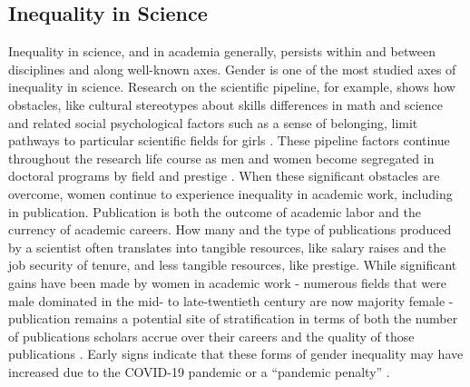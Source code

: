 \documentclass[
  10pt,
  letterpaper,
]{article}
\begin{document}
\subsection{Inequality in Science}\label{inequality-in-science}

Inequality in science, and in academia generally, persists within and
between disciplines and along well-known axes. Gender is one of the most
studied axes of inequality in science. Research on the scientific
pipeline, for example, shows how obstacles, like cultural stereotypes
about skills differences in math and science and related social
psychological factors such as a sense of belonging, limit pathways to
particular scientific fields for girls
\citep{cech_professional_2011, ma_math_2021, penner_men_2019}. These
pipeline factors continue throughout the research life course as men and
women become segregated in doctoral programs by field and prestige
\citep{weeden_degrees_2017a}. When these significant obstacles are
overcome, women continue to experience inequality in academic work,
including in publication. Publication is both the outcome of academic
labor and the currency of academic careers. How many and the type of
publications produced by a scientist often translates into tangible
resources, like salary raises and the job security of tenure, and less
tangible resources, like prestige. While significant gains have been
made by women in academic work - numerous fields that were male
dominated in the mid- to late-twentieth century are now majority female
- publication remains a potential site of stratification in terms of
both the number of publications scholars accrue over their careers and
the quality of those publications
\citep{xie_sex_1998, light_gender_2009}. Early signs indicate that these
forms of gender inequality may have increased due to the COVID-19
pandemic or a ``pandemic penalty'' \citep{king_pandemic_2021}.
\end{document}
